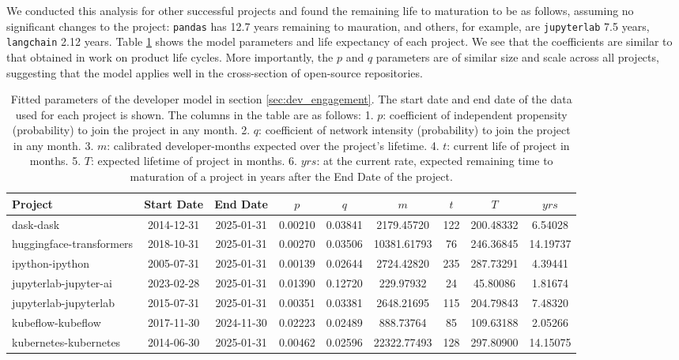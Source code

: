 \documentclass[conference]{IEEEtran}
\begin{document}
We conducted this analysis for other successful projects and found the remaining life to maturation to be as follows, assuming no significant changes to the project: {\tt pandas} has 12.7 years remaining to mauration, and others, for example, are {\tt jupyterlab} 7.5 years, {\tt langchain} 2.12 years. Table \ref{os_developer_model_stats} shows the model parameters and life expectancy of each project. We see that the coefficients are similar to that obtained in work on product life cycles. More importantly, the $p$ and $q$ parameters are of similar size and scale across all projects, suggesting that the model applies well in the cross-section of open-source repositories. 

\begin{table}
\centering
\caption{\label{os_developer_model_stats} \small Fitted parameters of the developer model in section \ref{sec:dev_engagement}. The start date and end date of the data used for each project is shown. The columns in the table are as follows: 1. $p$: coefficient of independent propensity (probability) to join the project in any month.
2. $q$: coefficient of network intensity (probability) to join the project in any month.
3. $m$: calibrated developer-months expected over the project's lifetime.
4. $t$: current life of project in months.
5. $T$: expected lifetime of project in months.
6. $yrs$: at the current rate, expected remaining time to maturation of a project in years after the End Date of the project.
}
\begin{tabular}{lcccccccc}
\toprule
Project & Start Date & End Date & $p$ & $q$ & $m$ & $t$ & $T$ & $yrs$ \\
\midrule
dask-dask & 2014-12-31 & 2025-01-31 & 0.00210 & 0.03841 & 2179.45720 & 122 & 200.48332 & 6.54028 \\
huggingface-transformers & 2018-10-31 & 2025-01-31 & 0.00270 & 0.03506 & 10381.61793 & 76 & 246.36845 & 14.19737 \\
ipython-ipython & 2005-07-31 & 2025-01-31 & 0.00139 & 0.02644 & 2724.42820 & 235 & 287.73291 & 4.39441 \\
jupyterlab-jupyter-ai & 2023-02-28 & 2025-01-31 & 0.01390 & 0.12720 & 229.97932 & 24 & 45.80086 & 1.81674 \\
jupyterlab-jupyterlab & 2015-07-31 & 2025-01-31 & 0.00351 & 0.03381 & 2648.21695 & 115 & 204.79843 & 7.48320 \\
kubeflow-kubeflow & 2017-11-30 & 2024-11-30 & 0.02223 & 0.02489 & 888.73764 & 85 & 109.63188 & 2.05266 \\
kubernetes-kubernetes & 2014-06-30 & 2025-01-31 & 0.00462 & 0.02596 & 22322.77493 & 128 & 297.80900 & 14.15075 \\

\end{tabular}
\end{table}
\end{document}
